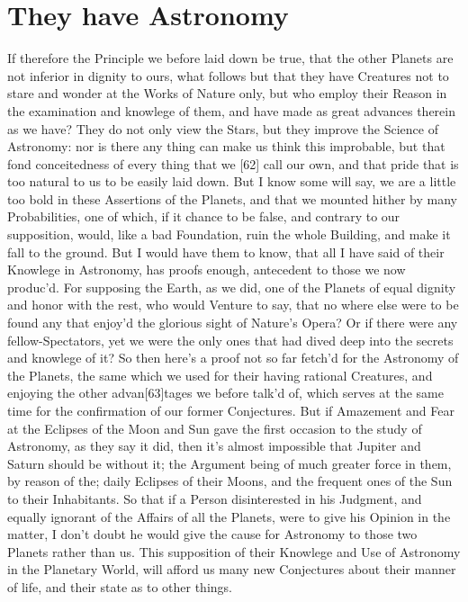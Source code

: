 \documentclass[letterpaper]{book}
\begin{document}
\section{They have Astronomy}

If therefore the Principle we before laid down be true, that the other
Planets are not inferior in dignity to ours, what follows but that they have
Creatures not to stare and wonder at the Works of Nature only, but who
employ their Reason in the examination and knowlege of them, and have made
as great advances therein as we have? They do not only view the Stars, but
they improve the Science of Astronomy: nor is there any thing can make us
think this improbable, but that fond conceitedness of every thing that we
[62] call our own, and that pride that is too natural to us to be easily
laid down. But I know some will say, we are a little too bold in these
Assertions of the Planets, and that we mounted hither by many Probabilities,
one of which, if it chance to be false, and contrary to our supposition,
would, like a bad Foundation, ruin the whole Building, and make it fall to
the ground.  But I would have them to know, that all I have said of their
Knowlege in Astronomy, has proofs enough, antecedent to those we now
produc'd. For supposing the Earth, as we did, one of the Planets of equal
dignity and honor with the rest, who would Venture to say, that no where
else were to be found any that enjoy'd the glorious sight of Nature's Opera?
Or if there were any fellow-Spectators, yet we were the only ones that had
dived deep into the secrets and knowlege of it? So then here's a proof not
so far fetch'd for the Astronomy of the Planets, the same which we used for
their having rational Creatures, and enjoying the other advan[63]tages we
before talk'd of, which serves at the same time for the confirmation of our
former Conjectures. But if Amazement and Fear at the Eclipses of the Moon
and Sun gave the first occasion to the study of Astronomy, as they say it
did, then it's almost impossible that Jupiter and Saturn should be without
it; the Argument being of much greater force in them, by reason of the;
daily Eclipses of their Moons, and the frequent ones of the Sun to their
Inhabitants. So that if a Person disinterested in his Judgment, and equally
ignorant of the Affairs of all the Planets, were to give his Opinion in the
matter, I don't doubt he would give the cause for Astronomy to those two
Planets rather than us.  This supposition of their Knowlege and Use of
Astronomy in the Planetary World, will afford us many new Conjectures
about their manner of life, and their state as to other things.
\end{document}
